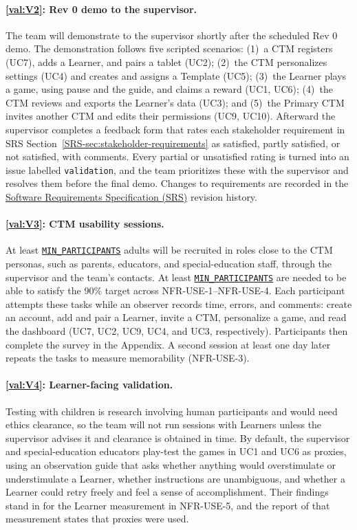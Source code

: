 \documentclass[12pt, titlepage]{article}
\newcommand{\srsref}[1]{#1}
\newcounter{validation}
\newcommand{\valref}[1]{\hyperref[val:V#1]{\ref*{val:V#1}}}
\newcommand{\srssectionref}[1]{SRS Section~\ref*{SRS-#1}}
\newcommand{\paramref}[2]{\hyperlink{param:#1}{\texttt{#2}}}
\begin{document}
\paragraph{\valref{2}: Rev 0 demo to the supervisor.} The team will demonstrate
\progname{} to the supervisor shortly after the scheduled Rev 0 demo. The
demonstration follows five scripted scenarios: (1)~a CTM registers (UC7), adds
a Learner, and pairs a tablet (UC2); (2)~the CTM personalizes settings (UC4)
and creates and assigns a Template (UC5); (3)~the Learner plays a game, using
pause and the guide, and claims a reward (UC1, UC6); (4)~the CTM reviews and
exports the Learner's data (UC3); and (5)~the Primary CTM invites another CTM
and edits their permissions (UC9, UC10). Afterward the supervisor completes a
feedback form that rates each stakeholder requirement in \srssectionref{sec:stakeholder-requirements} as
satisfied, partly satisfied, or not satisfied, with comments. Every
partial or unsatisfied rating is turned into an issue labelled \texttt{validation}, and
the team prioritizes these with the supervisor and resolves them before the
final demo. Changes to requirements are recorded in the
\href{https://github.com/meena-alomran/game-n-grow/blob/main/pdfs/SRS-IEEE/SRS.pdf}{Software Requirements Specification (SRS)} revision history.

\paragraph{\valref{3}: CTM usability sessions.} At least \paramref{min-participants}{MIN\_PARTICIPANTS} adults will be recruited
in roles close to the CTM personas, such as parents, educators, and
special-education staff, through the supervisor and the team's contacts. At least \paramref{min-participants}{MIN\_PARTICIPANTS} are needed to be able to satisfy the 90\% target across \srsref{NFR-USE-1}--\srsref{NFR-USE-4}.
Each participant attempts these tasks while an observer records time, errors, and
comments: create an account, add and pair a Learner, invite a CTM, personalize a
game, and read the dashboard (UC7, UC2, UC9, UC4, and UC3, respectively). Participants then complete the survey in the
Appendix. A second session at least one day later repeats the tasks to measure
memorability (\srsref{NFR-USE-3}).

\paragraph{\valref{4}: Learner-facing validation.} Testing with children is research
involving human participants and would need ethics clearance, so the team will
not run sessions with Learners unless the supervisor advises it and clearance is
obtained in time. By default, the supervisor and special-education educators
play-test the games in UC1 and UC6 as proxies, using an observation guide that asks whether
anything would overstimulate or understimulate a Learner, whether instructions
are unambiguous, and whether a Learner could retry freely and feel a sense of
accomplishment. Their findings stand in for the Learner measurement in
\srsref{NFR-USE-5}, and the report of that measurement states that proxies were used.
\end{document}
